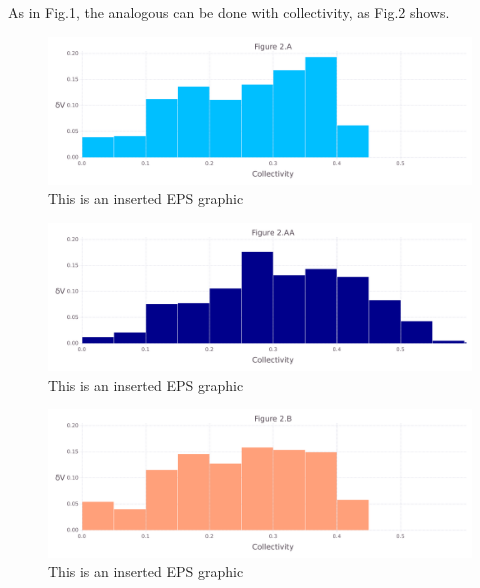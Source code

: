 \documentclass[10pt,letterpaper]{article}
\begin{document}
\clearpage
As in Fig.1, the analogous can be done with collectivity, as Fig.2 shows.

\begin{figure}[ht]
\begin{center}
\includegraphics[scale=0.5]{1xkk/2afigure_very_hi-precision.pdf}
\caption{This is an inserted EPS graphic}
\label{fig3}
\end{center}
\end{figure}

\begin{figure}[ht]
\begin{center}
\includegraphics[scale=0.5]{1xkk/2aafigure_very_hi-precision.pdf}
\caption{This is an inserted EPS graphic}
\label{fig4}
\end{center}
\end{figure}

\begin{figure}[ht]
\begin{center}
\includegraphics[scale=0.5]{1xkk/2bfigure_very_hi-precision.pdf}
\caption{This is an inserted EPS graphic}
\label{fig5}
\end{center}
\end{figure}
\end{document}
